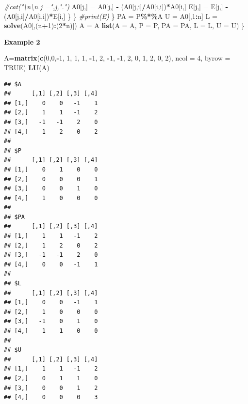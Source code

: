 \documentclass[
]{book}
\newenvironment{Shaded}{\begin{snugshade}}{\end{snugshade}}
\newcommand{\AttributeTok}[1]{\textcolor[rgb]{0.13,0.29,0.53}{#1}}
\newcommand{\CommentTok}[1]{\textcolor[rgb]{0.56,0.35,0.01}{\textit{#1}}}
\newcommand{\ConstantTok}[1]{\textcolor[rgb]{0.56,0.35,0.01}{#1}}
\newcommand{\DecValTok}[1]{\textcolor[rgb]{0.00,0.00,0.81}{#1}}
\newcommand{\FunctionTok}[1]{\textcolor[rgb]{0.13,0.29,0.53}{\textbf{#1}}}
\newcommand{\NormalTok}[1]{#1}
\newcommand{\OtherTok}[1]{\textcolor[rgb]{0.56,0.35,0.01}{#1}}
\newcommand{\SpecialCharTok}[1]{\textcolor[rgb]{0.81,0.36,0.00}{\textbf{#1}}}
\begin{document}
\begin{Shaded}
\begin{Highlighting}[]
             \CommentTok{\#cat("\textbackslash{}n\textbackslash{}n j =",j,".")}
\NormalTok{             A0[j,] }\OtherTok{=}\NormalTok{ A0[j,] }\SpecialCharTok{{-}}\NormalTok{ (A0[j,i]}\SpecialCharTok{/}\NormalTok{A0[i,i])}\SpecialCharTok{*}\NormalTok{A0[i,]}
\NormalTok{             E[j,] }\OtherTok{=}\NormalTok{ E[j,] }\SpecialCharTok{{-}}\NormalTok{ (A0[j,i]}\SpecialCharTok{/}\NormalTok{A0[i,i])}\SpecialCharTok{*}\NormalTok{E[i,]}
\NormalTok{            \}}
\NormalTok{        \}}
       \CommentTok{\#print(E)}
\NormalTok{     \}}
\NormalTok{   PA }\OtherTok{=}\NormalTok{ P}\SpecialCharTok{\%*\%}\NormalTok{A}
\NormalTok{   U }\OtherTok{=}\NormalTok{ A0[,}\DecValTok{1}\SpecialCharTok{:}\NormalTok{n]}
\NormalTok{   L }\OtherTok{=} \FunctionTok{solve}\NormalTok{(A0[,(n}\SpecialCharTok{+}\DecValTok{1}\NormalTok{)}\SpecialCharTok{:}\NormalTok{(}\DecValTok{2}\SpecialCharTok{*}\NormalTok{n)])}
\NormalTok{   A }\OtherTok{=}\NormalTok{ A}
   \FunctionTok{list}\NormalTok{(}\AttributeTok{A =}\NormalTok{ A, }\AttributeTok{P =}\NormalTok{ P, }\AttributeTok{PA =}\NormalTok{ PA, }\AttributeTok{L =}\NormalTok{ L, }\AttributeTok{U =}\NormalTok{ U)}
\NormalTok{ \}}
\end{Highlighting}
\end{Shaded}

\hfill\break

\textbf{Example 2}

\begin{Shaded}
\begin{Highlighting}[]
\NormalTok{A}\OtherTok{=}\FunctionTok{matrix}\NormalTok{(}\FunctionTok{c}\NormalTok{(}\DecValTok{0}\NormalTok{,}\DecValTok{0}\NormalTok{,}\SpecialCharTok{{-}}\DecValTok{1}\NormalTok{, }\DecValTok{1}\NormalTok{, }\DecValTok{1}\NormalTok{, }\DecValTok{1}\NormalTok{, }\SpecialCharTok{{-}}\DecValTok{1}\NormalTok{, }\DecValTok{2}\NormalTok{, }\SpecialCharTok{{-}}\DecValTok{1}\NormalTok{, }\SpecialCharTok{{-}}\DecValTok{1}\NormalTok{, }\DecValTok{2}\NormalTok{, }\DecValTok{0}\NormalTok{, }\DecValTok{1}\NormalTok{, }\DecValTok{2}\NormalTok{, }\DecValTok{0}\NormalTok{, }\DecValTok{2}\NormalTok{), }\AttributeTok{ncol  =} \DecValTok{4}\NormalTok{, }\AttributeTok{byrow =} \ConstantTok{TRUE}\NormalTok{)}
\FunctionTok{LU}\NormalTok{(A)}
\end{Highlighting}
\end{Shaded}

\begin{verbatim}
## $A
##      [,1] [,2] [,3] [,4]
## [1,]    0    0   -1    1
## [2,]    1    1   -1    2
## [3,]   -1   -1    2    0
## [4,]    1    2    0    2
## 
## $P
##      [,1] [,2] [,3] [,4]
## [1,]    0    1    0    0
## [2,]    0    0    0    1
## [3,]    0    0    1    0
## [4,]    1    0    0    0
## 
## $PA
##      [,1] [,2] [,3] [,4]
## [1,]    1    1   -1    2
## [2,]    1    2    0    2
## [3,]   -1   -1    2    0
## [4,]    0    0   -1    1
## 
## $L
##      [,1] [,2] [,3] [,4]
## [1,]    0    0   -1    1
## [2,]    1    0    0    0
## [3,]   -1    0    1    0
## [4,]    1    1    0    0
## 
## $U
##      [,1] [,2] [,3] [,4]
## [1,]    1    1   -1    2
## [2,]    0    1    1    0
## [3,]    0    0    1    2
## [4,]    0    0    0    3
\end{verbatim}
\end{document}
